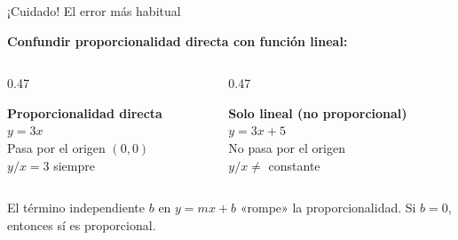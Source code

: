 \documentclass[aspectratio=169, 10pt, spanish]{beamer}
\begin{document}
\begin{frame}{¡Cuidado! El error más habitual}
  \begin{errorbox}
    \textbf{Confundir proporcionalidad directa con función lineal:}
    \vspace{0.2cm}

    \begin{columns}[t]
      \begin{column}{0.47\textwidth}
        \begin{center}
          \correcto\; \textbf{Proporcionalidad directa}\\[4pt]
          $y = 3x$\\[4pt]
          {\AlmFontSmall Pasa por el origen $(0,0)$}\\
          {\AlmFontSmall $y/x = 3$ siempre}
        \end{center}
      \end{column}
      \begin{column}{0.47\textwidth}
        \begin{center}
          \incorrecto\; \textbf{Solo lineal (no proporcional)}\\[4pt]
          $y = 3x + 5$\\[4pt]
          {\AlmFontSmall No pasa por el origen}\\
          {\AlmFontSmall $y/x \neq$ constante}
        \end{center}
      \end{column}
    \end{columns}
    \vspace{0.3cm}
    El término independiente $b$ en $y = mx + b$ «rompe» la proporcionalidad. Si $b = 0$, entonces sí es proporcional.
  \end{errorbox}
\end{frame}
\end{document}
